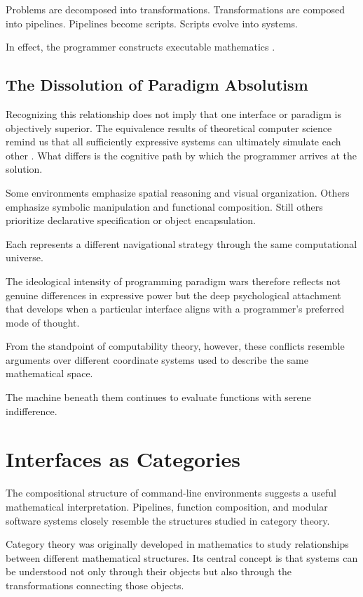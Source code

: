 \documentclass[11pt]{article}
\theoremstyle{definition}
\begin{document}
Problems are decomposed into transformations.
Transformations are composed into pipelines.
Pipelines become scripts.
Scripts evolve into systems.

In effect, the programmer constructs executable mathematics \cite{knuth1984}.

\subsection{The Dissolution of Paradigm Absolutism}

Recognizing this relationship does not imply that one interface or
paradigm is objectively superior. The equivalence results of theoretical
computer science remind us that all sufficiently expressive systems can
ultimately simulate each other \cite{kleene1952}. What differs is the
cognitive path by which the programmer arrives at the solution.

Some environments emphasize spatial reasoning and visual organization.
Others emphasize symbolic manipulation and functional composition.
Still others prioritize declarative specification or object
encapsulation.

Each represents a different navigational strategy through the same
computational universe.

The ideological intensity of programming paradigm wars therefore
reflects not genuine differences in expressive power but the deep
psychological attachment that develops when a particular interface
aligns with a programmer's preferred mode of thought.

From the standpoint of computability theory, however, these conflicts
resemble arguments over different coordinate systems used to describe
the same mathematical space.

The machine beneath them continues to evaluate functions with serene
indifference.

\section{Interfaces as Categories}

The compositional structure of command-line environments suggests a
useful mathematical interpretation. Pipelines, function composition,
and modular software systems closely resemble the structures studied
in category theory.

Category theory was originally developed in mathematics to study
relationships between different mathematical structures. Its central
concept is that systems can be understood not only through their
objects but also through the transformations connecting those objects.
\end{document}
